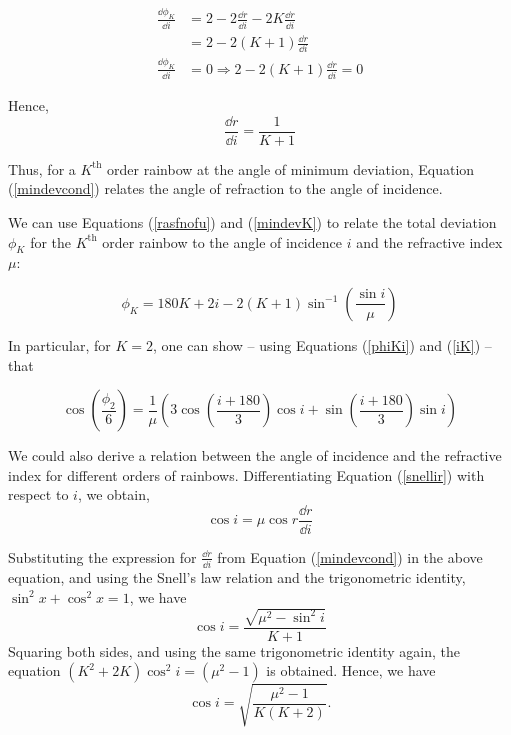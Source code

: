 \begin{equation*}
\begin{aligned}
\frac{\dd\phi_{K}}{\dd i}&=2-2\frac{\dd r}{\dd i}-2K\frac{\dd r}{\dd i}\\
&=2-2(K+1)\frac{\dd r}{\dd i}\\
\frac{\dd \phi_{K}}{\dd i}&=0\Rightarrow2-2(K+1)\frac{\dd r}{\dd i}=0
\end{aligned}
\end{equation*}

Hence,         
\begin{equation}
    \frac{\dd r}{\dd i}=\frac{1}{K+1}
    \label{mindevcond}
\end{equation}

Thus, for a $K^\text{th}$ order rainbow at the angle of minimum deviation, Equation (\ref{mindevcond}) relates the angle of refraction to the angle of incidence. 

We can use  Equations (\ref{rasfnofu}) and (\ref{mindevK}) to relate the total deviation $\phi_K$ for the $K^\text{th}$ order rainbow to the angle of incidence $i$ and the refractive index $\mu$:
 
 \begin{equation}
     \phi_K = 180K + 2i - 2(K+1)\sin^{-1}\left(\frac{\sin i}{\mu}\right)
     \label{phiKi}
 \end{equation}

In particular, for $K = 2$, one can show -- using Equations (\ref{phiKi}) and (\ref{iK}) -- that 

\begin{equation}
   \cos\left( \frac{\phi_2}{6}\right) = \frac{1}{\mu}\left( 3 \cos\left(\frac{i + 180}{3}\right) \cos{i} + \sin\left(\frac{i + 180}{3}\right)\sin{i} \right)
\end{equation}


We could also derive a relation between the angle of incidence and the refractive index for different orders of rainbows. Differentiating Equation (\ref{snellir}) with respect to $i$, we obtain,
 \begin{equation*}
     \cos i = \mu\cos r \frac{\dd r}{\dd i}
\end{equation*}

Substituting the expression for $\frac{\dd r}{\dd i}$ from Equation (\ref{mindevcond}) in the above equation, and using the Snell's law relation and the trigonometric identity, $\sin^2 x + \cos^2 x = 1$, we have
\begin{equation}
\cos i=\frac{\sqrt{\mu^{2}-\sin^{2}i}}{K+1}
\end{equation}
Squaring both sides, and using the same trigonometric identity again, the equation $(K^2 + 2K)\cos^2 i = (\mu^2 - 1)$ is obtained.
Hence, we have
\begin{equation}
    \cos i = \sqrt{\frac{\mu^2 - 1}{K(K+2)}}.
    \label{iK}
\end{equation}
 

